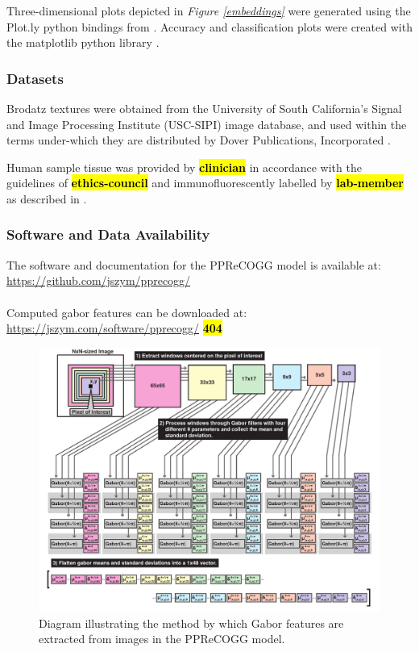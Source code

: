 Three-dimensional plots depicted in \textit{Figure \ref{embeddings}} were generated using the Plot.ly python bindings from \cite{plotly}. Accuracy and classification plots were created with the \mbox{matplotlib} python library \citep{hunter2007}.\par

\subsubsection{Datasets}
Brodatz textures were obtained from the University of South California's Signal and Image Processing Institute (USC-SIPI) image database, and used within the terms under-which they are distributed by Dover Publications, Incorporated \citep{brodatz1999}.\par

Human sample tissue was provided by \hl{\textbf{clinician}} in accordance with the guidelines of \hl{\textbf{ethics-council}} and immunofluorescently labelled by \hl{\textbf{lab-member}} as described in \citep{halaoui2017}.\par

\subsubsection{Software and Data Availability}

The software and documentation for the PPReCOGG model is available at:\\ \url{https://github.com/jszym/pprecogg/}
\\\\
Computed gabor features can be downloaded at:\\ 
\url{https://jszym.com/software/pprecogg/}  \hl{\textbf{404}}

\begin{landscape}
	\begin{figure}[ht!]
		\centering
		\includegraphics[width=190mm]{figures/gabor-kmknn-figure2.pdf}
		\caption{Diagram illustrating the method by which Gabor features are extracted from images in the PPReCOGG model. \label{gabor_diagram}}
	\end{figure}
\end{landscape}

